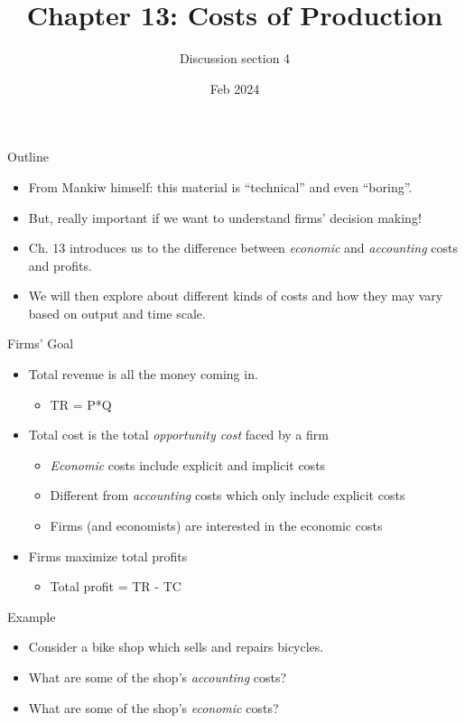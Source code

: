 \documentclass[aspectratio=169]{beamer}
\title{Chapter 13: Costs of Production}
\author{Discussion section 4}
\date{Feb 2024}
\begin{document}
\begin{frame}
    \titlepage 
\end{frame}

\begin{frame}{Outline}
    \begin{itemize}
        \item From Mankiw himself: this material is ``technical'' and even ``boring''.
        \item But, really important if we want to understand firms' decision making!
        \item Ch. 13 introduces us to the difference between \textit{economic} and \textit{accounting} costs and profits.
        \item We will then explore about different kinds of costs and how they may vary based on output and time scale.
    \end{itemize}
\end{frame}

\begin{frame}{Firms' Goal}
    \begin{itemize}
        \item Total revenue is all the money coming in.
            \begin{itemize}
                \item TR = P*Q
            \end{itemize}
        \item Total cost is the total \textit{opportunity cost} faced by a firm
            \begin{itemize}
                \item \textit{Economic} costs include explicit and implicit costs
                \item Different from \textit{accounting} costs which only include explicit costs
                \item Firms (and economists) are interested in the economic costs
            \end{itemize}
        \item Firms maximize total profits
            \begin{itemize}
                \item Total profit = TR - TC
            \end{itemize}
    \end{itemize}
\end{frame}

\begin{frame}{Example}
    \begin{itemize}
        \item Consider a bike shop which sells and repairs bicycles.
        \item What are some of the shop's \textit{accounting} costs?
        \item What are some of the shop's \textit{economic} costs?
    \end{itemize}
\end{frame}
\end{document}

